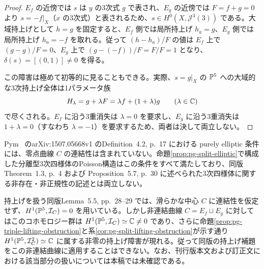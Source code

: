 \begin{proof}
$E_f$ の近傍では $s$ は $y$ の3次式 $g$ で表され、$E_g$ の近傍では $F=f+g=0$ より $s=-f|_X$（$x$ の3次式）と表されるため、$s\in H^0(X,\mathcal J^3(3))$ である。大域持上げとして $h=g$ を固定すると、$E_f$ 側では局所持上げ $h_a=g$、$E_g$ 側では局所持上げ $h_a=-f$ を取れる。従って $(h-h_a)/F$ の値は $E_f$ 上で $(g-g)/F=0$、$E_g$ 上で $(g-(-f))/F=F/F=1$ となり、$\delta(s)=[(0,1)]\ne0$ を得る。

この障害は極めて初等的に見ることもできる。実際、$s=g|_X$ の $\mathbb P^5$ への大域的な3次持上げ全体は1パラメータ族
\begin{equation}\label{eq:pg-split-ambient-lift}
 H_\lambda=g+\lambda F=\lambda f+(1+\lambda)g\qquad(\lambda\in\mathbb C)
\end{equation}
で尽くされる。$E_f$ に沿う3重消失は $\lambda=0$ を要求し、$E_g$ に沿う3重消失は $1+\lambda=0$（すなわち $\lambda=-1$）を要求するため、両者は決して両立しない。
\end{proof}

\begin{remark}
\label{rem:pg-split-elliptic-lift-obstruction}
Pym~\cite{PPymElliptic} のarXiv:1507.05668v1 のDefinition~4.2, p.~17 における purely elliptic 条件には、零点曲線 $C$ の連結性は含まれていない。命題\ref{prop:pg-split-elliptic}で構成した分離型3次四様体のPoisson構造はこの条件をすべて満たしており、同版Theorem~1.3, p.~4 および Proposition~5.7, p.~30 に述べられた3次四様体に関する非存在・非正規性の記述とは両立しない。

持上げを扱う同版Lemma~5.5, pp.~28--29 では、滑らかな中心 $C$ に連結性を仮定せず、$H^1(\mathbb P^5,\mathcal I_C)=0$ を用いている。しかし非連結曲線 $C=E_f\sqcup E_g$ に対してはこのコホモロジー群は $H^1(\mathbb P^5,\mathcal I_C)\simeq\mathbb C\ne0$ であり、さらに命題\ref{prop:pg-triple-lifting-obstruction}と系\ref{cor:pg-split-lifting-obstruction}が示す通り $H^1(\mathbb P^5,\mathcal I_C^2)\simeq\mathbb C$ に属する非零の持上げ障害が現れる。従って同版の持上げ補題をこの非連結曲線に適用することはできない。なお、刊行版本文および訂正文における該当部分の扱いについては本稿では未確認である。
\end{remark}
